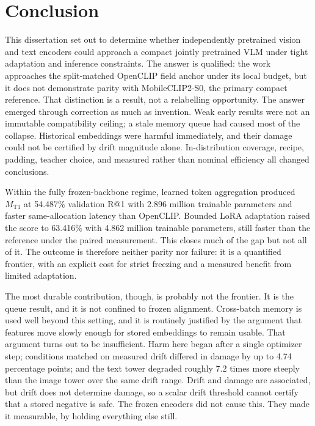 \documentclass[11pt,a4paper,oneside]{report}
\newcommand{\MTone}{\ensuremath{M_{\mathrm{T1}}}}
\begin{document}
\chapter{Conclusion}
This dissertation set out to determine whether independently pretrained vision and text encoders could approach a compact jointly pretrained VLM under tight adaptation and inference constraints. The answer is qualified: the work approaches the split-matched OpenCLIP field anchor under its local budget, but it does not demonstrate parity with MobileCLIP2-S0, the primary compact reference. That distinction is a result, not a relabelling opportunity. The answer emerged through correction as much as invention. Weak early results were not an immutable compatibility ceiling; a stale memory queue had caused most of the collapse. Historical embeddings were harmful immediately, and their damage could not be certified by drift magnitude alone. In-distribution coverage, recipe, padding, teacher choice, and measured rather than nominal efficiency all changed conclusions.

Within the fully frozen-backbone regime, learned token aggregation produced \MTone{} at 54.487\% validation R@1 with 2.896 million trainable parameters and faster same-allocation latency than OpenCLIP. Bounded LoRA adaptation raised the score to 63.416\% with 4.862 million trainable parameters, still faster than the reference under the paired measurement. This closes much of the gap but not all of it. The outcome is therefore neither parity nor failure: it is a quantified frontier, with an explicit cost for strict freezing and a measured benefit from limited adaptation.

The most durable contribution, though, is probably not the frontier. It is the queue result, and it is not confined to frozen alignment. Cross-batch memory is used well beyond this setting, and it is routinely justified by the argument that features move slowly enough for stored embeddings to remain usable. That argument turns out to be insufficient. Harm here began after a single optimizer step; conditions matched on measured drift differed in damage by up to 4.74 percentage points; and the text tower degraded roughly 7.2 times more steeply than the image tower over the same drift range. Drift and damage are associated, but drift does not determine damage, so a scalar drift threshold cannot certify that a stored negative is safe. The frozen encoders did not cause this. They made it measurable, by holding everything else still.
\end{document}
